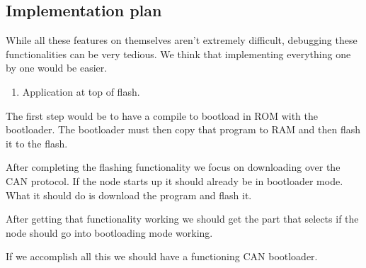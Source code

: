 \documentclass[twocolumn]{article}
\begin{document}
	
	
	
	
	\subsection*{Implementation plan}
		While all these features on themselves aren't extremely difficult, debugging these functionalities can be very tedious.
		We think that implementing everything one by one would be easier.
		\begin{enumerate}
			\item Application at top of flash.
		\end{enumerate}
		
		The first step would be to have a compile to bootload in ROM with the bootloader.
		The bootloader must then copy that program to RAM and then flash it to the flash.
		
		After completing the flashing functionality we focus on downloading over the CAN protocol.
		If the node starts up it should already be in bootloader mode.
		What it should do is download the program and flash it.
		
		After getting that functionality working we should get the part that selects if the node should go into bootloading mode working.
		
		If we accomplish all this we should have a functioning CAN bootloader.
\end{document}
